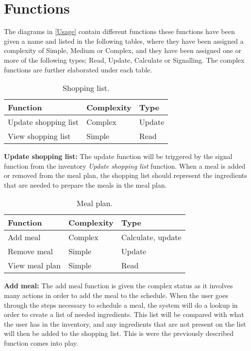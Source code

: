 \section{Functions}
The diagrams in \cref{Usage} contain different functions these functions have been given a name and listed in the following tables, where they have been assigned a complexity of Simple, Medium or Complex, and they have been assigned one or more of the following types; Read, Update, Calculate or Signalling. The complex functions are further elaborated under each table.

\begin{table}[H]
	\centering
	\begin{tabular}{|l|l|l|}\hline	\textbf{Function}&\textbf{Complexity}&\textbf{Type}\\\hline
	  Update shopping list  &  Complex & Update \\\hline
	  View shopping list    &  Simple  & Read   \\\hline
  \end{tabular}
	\caption{Shopping list.}
\end{table}
\textbf{Update shopping list:} The update function will be triggered by the signal function from the inventory \textit{Update shopping list} function. When a meal is added or removed from the meal plan, the shopping list should represent the ingredients that are needed to prepare the meals in the meal plan.
	\begin{table}[H]
	\centering
  \begin{tabular}{|l|l|l|}\hline
		\textbf{Function}&\textbf{Complexity}&\textbf{Type}\\\hline
	  Add meal              &  Complex & Calculate, update \\\hline
	  Remove meal           &  Simple  & Update            \\\hline
	  View meal plan        &  Simple  & Read              \\\hline
	  \end{tabular}
	\caption{Meal plan.}
  \end{table}
\textbf{Add meal:} The add meal function is given the complex status as it involves many actions in order to add the meal to the schedule. When the user goes through the steps necessary to schedule a meal, the system will do a lookup in order to create a list of needed ingredients. This list will be compared with what the user has in the inventory, and any ingredients that are not present on the list will then be added to the shopping list. This is were the previously described function comes into play.
